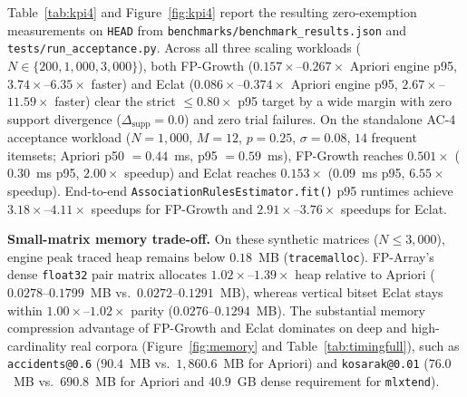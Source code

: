 \documentclass[journal,a4paper]{IEEEtran}
\begin{document}
Table~\ref{tab:kpi4} and Figure~\ref{fig:kpi4} report the resulting
zero-exemption measurements on \texttt{HEAD} from
\texttt{benchmarks/benchmark\_results.json} and \texttt{tests/run\_acceptance.py}.
Across all three scaling workloads ($N \in \{200, 1{,}000, 3{,}000\}$), both
FP-Growth ($0.157\times$--$0.267\times$ Apriori engine p95, $3.74\times$--$6.35\times$
faster) and Eclat ($0.086\times$--$0.374\times$ Apriori engine p95,
$2.67\times$--$11.59\times$ faster) clear the strict $\le 0.80\times$ p95
target by a wide margin with zero support divergence ($\Delta_{\mathrm{supp}} = 0.0$)
and zero trial failures. On the standalone AC-4 acceptance workload ($N=1{,}000$,
$M=12$, $p=0.25$, $\sigma=0.08$, $14$ frequent itemsets; Apriori p50 $=0.44$~ms,
p95 $=0.59$~ms), FP-Growth reaches $0.501\times$ ($0.30$~ms p95, $2.00\times$
speedup) and Eclat reaches $0.153\times$ ($0.09$~ms p95, $6.55\times$ speedup).
End-to-end \texttt{AssociationRulesEstimator.fit()} p95 runtimes achieve
$3.18\times$--$4.11\times$ speedups for FP-Growth and $2.91\times$--$3.76\times$
speedups for Eclat.

\textbf{Small-matrix memory trade-off.} On these synthetic matrices
($N \le 3{,}000$), engine peak traced heap remains below $0.18$~MB
(\texttt{tracemalloc}). FP-Array's dense \texttt{float32} pair matrix
allocates $1.02\times$--$1.39\times$ heap relative to Apriori ($0.0278$--$0.1799$~MB
vs.\ $0.0272$--$0.1291$~MB), whereas vertical bitset Eclat stays within
$1.00\times$--$1.02\times$ parity ($0.0276$--$0.1294$~MB). The substantial
memory compression advantage of FP-Growth and Eclat dominates on deep and
high-cardinality real corpora (Figure~\ref{fig:memory} and
Table~\ref{tab:timingfull}), such as \texttt{accidents@0.6} ($90.4$~MB vs.\
$1{,}860.6$~MB for Apriori) and \texttt{kosarak@0.01} ($76.0$~MB vs.\
$690.8$~MB for Apriori and $40.9$~GB dense requirement for \texttt{mlxtend}).
\end{document}
